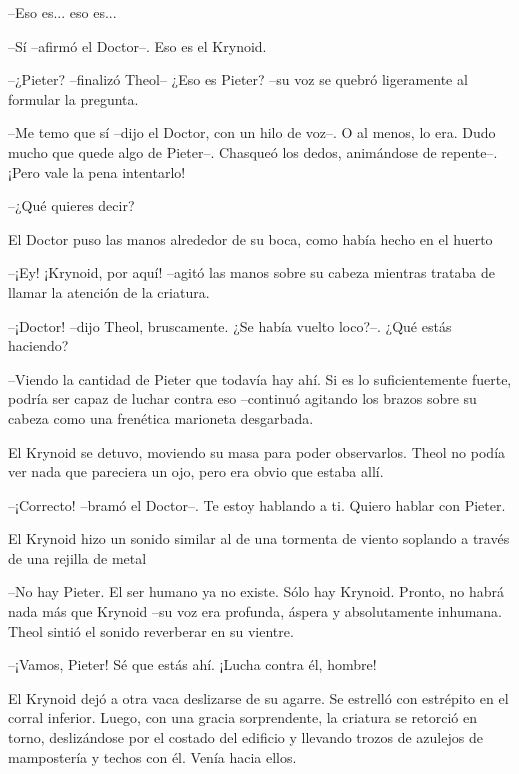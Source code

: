 --Eso es... eso es...



--Sí --afirmó el Doctor--. Eso es el Krynoid.



--¿Pieter? --finalizó Theol-- ¿Eso es Pieter? --su voz se quebró ligeramente al formular la pregunta.



--Me temo que sí --dijo el Doctor, con un hilo de voz--. O al menos, lo era. Dudo mucho que quede algo de Pieter--. Chasqueó los dedos, animándose de repente--. ¡Pero vale la pena intentarlo!



--¿Qué quieres decir?



El Doctor puso las manos alrededor de su boca, como había hecho en el huerto 

--¡Ey! ¡Krynoid, por aquí! --agitó las manos sobre su cabeza mientras trataba de llamar la atención de la criatura.



--¡Doctor! --dijo Theol, bruscamente. ¿Se había vuelto loco?--. ¿Qué estás haciendo?



--Viendo la cantidad de Pieter que todavía hay ahí. Si es lo suficientemente fuerte, podría ser capaz de luchar contra eso --continuó agitando los brazos sobre su cabeza como una frenética marioneta desgarbada.



El Krynoid se detuvo, moviendo su masa para poder observarlos. Theol no podía ver nada que pareciera un ojo, pero era obvio que estaba allí.



--¡Correcto! --bramó el Doctor--. Te estoy hablando a ti. Quiero hablar con Pieter.



El Krynoid hizo un sonido similar al de una tormenta de viento soplando a través de una rejilla de metal 

--No hay Pieter. El ser humano ya no existe. Sólo hay Krynoid. Pronto, no habrá nada más que Krynoid --su voz era profunda, áspera y absolutamente inhumana. Theol sintió el sonido reverberar en su vientre.



--¡Vamos, Pieter! Sé que estás ahí. ¡Lucha contra él, hombre!



El Krynoid dejó a otra vaca deslizarse de su agarre. Se estrelló con estrépito en el corral inferior. Luego, con una gracia sorprendente, la criatura se retorció en torno, deslizándose por el costado del edificio y llevando trozos de azulejos de mampostería y techos con él. Venía hacia ellos.



